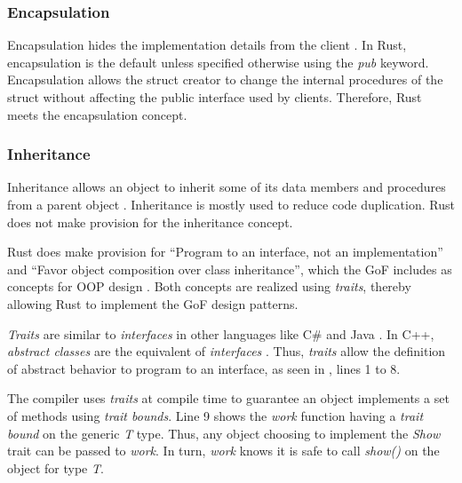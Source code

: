 \subsubsection{Encapsulation}
Encapsulation hides the implementation details from the client \cite{klabnik_2019_01,meyer_97_01,savitch_15_01}.
In Rust, encapsulation is the default unless specified otherwise using the \textit{pub} keyword.
Encapsulation allows the struct creator to change the internal procedures of the struct without affecting the public interface used by clients.
Therefore, Rust meets the encapsulation concept.

\subsubsection{Inheritance}
Inheritance allows an object to inherit some of its data members and procedures from a parent object \cite{meyer_97_01,stefik_85_01,gamma_94_01,savitch_15_01}.
Inheritance is mostly used to reduce code duplication.
Rust does not make provision for the inheritance concept.

Rust does make provision for ``Program to an interface, not an implementation'' and ``Favor object composition over class inheritance'', which the GoF includes as concepts for OOP design \cite{gamma_94_01}.
Both concepts are realized using \textit{traits}, thereby allowing Rust to implement the GoF design patterns.

\textit{Traits} are similar \cite{klabnik_2019_01} to \textit{interfaces} in other languages like C\# \cite{robinson_04_01} and Java \cite{gosling_96_01}.
In C++, \textit{abstract classes} are the equivalent of \textit{interfaces} \cite{malik_09_01,stroustrup_13_01,alexandrescu_01_01}.
Thus, \textit{traits} allow the definition of abstract behavior to program to an interface, as seen in , lines 1 to 8.


The compiler uses \textit{traits} at compile time to guarantee an object implements a set of methods using \textit{trait bounds}.
Line 9 shows the \textit{work} function having a \textit{trait bound} on the generic \textit{T} type.
Thus, any object choosing to implement the \textit{Show} trait can be passed to \textit{work}.
In turn, \textit{work} knows it is safe to call \textit{show()} on the object for type \textit{T}.


